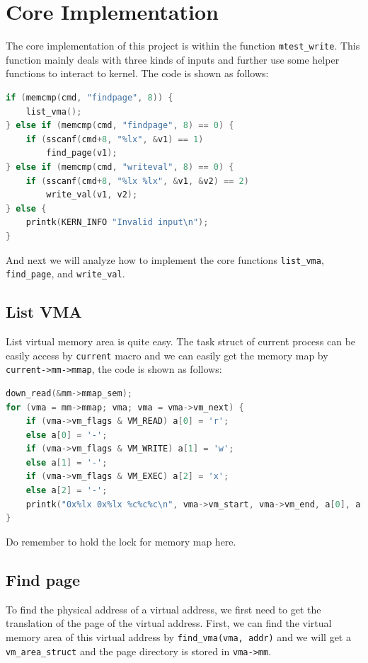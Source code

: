 \documentclass{article}
\begin{document}
\section{Core Implementation}
The core implementation of this project is within the function \verb|mtest_write|. This function mainly deals with three kinds of inputs and further use some helper functions to interact to kernel. The code is shown as follows:
\begin{lstlisting}[language=C]
if (memcmp(cmd, "findpage", 8)) {
	list_vma();
} else if (memcmp(cmd, "findpage", 8) == 0) {
	if (sscanf(cmd+8, "%lx", &v1) == 1)
		find_page(v1);
} else if (memcmp(cmd, "writeval", 8) == 0) {
	if (sscanf(cmd+8, "%lx %lx", &v1, &v2) == 2)
		write_val(v1, v2);
} else {
	printk(KERN_INFO "Invalid input\n");
}
\end{lstlisting}
And next we will analyze how to implement the core functions \verb|list_vma|, \verb|find_page|, and \verb|write_val|.
\subsection{List VMA}
List virtual memory area is quite easy. The task struct of current process can be easily access by \texttt{current} macro and we can easily get the memory map by \texttt{current->mm->mmap}, the code is shown as follows:
\begin{lstlisting}[language=c]
down_read(&mm->mmap_sem);
for (vma = mm->mmap; vma; vma = vma->vm_next) {
	if (vma->vm_flags & VM_READ) a[0] = 'r';
	else a[0] = '-';
	if (vma->vm_flags & VM_WRITE) a[1] = 'w';
	else a[1] = '-';
	if (vma->vm_flags & VM_EXEC) a[2] = 'x';
	else a[2] = '-';
	printk("0x%lx 0x%lx %c%c%c\n", vma->vm_start, vma->vm_end, a[0], a[1], a[2]);
}
\end{lstlisting}
Do remember to hold the lock for memory map here.

\subsection{Find page}
To find the physical address of a virtual address, we first need to get the translation of the page of the virtual address. First, we can find the virtual memory area of this virtual address by \verb|find_vma(vma, addr)| and we will get a \verb|vm_area_struct| and the page directory is stored in \verb|vma->mm|.
\end{document}
